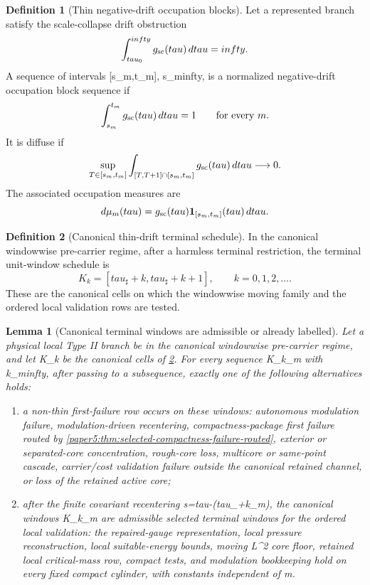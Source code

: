 \documentclass[11pt]{amsart}
\def\({}%
\def\){}%
\def\tau{tau}%
\def\infty{infty}%
\theoremstyle{plain}
\newtheorem{lemma}[lemma]{Lemma}
\theoremstyle{definition}
\newtheorem{definition}[definition]{Definition}
\theoremstyle{remark}
\begin{document}
\begin{definition}[Thin negative-drift occupation blocks]
\label{paper6a:def:thin-negative-drift-occupation-blocks}
Let a represented branch satisfy the scale-collapse drift obstruction
\[
  \int_{\tau_0}^{\infty} g_{\rm sc}(\tau)\,d\tau=\infty .
\]
A sequence of intervals \([s_m,t_m]\), \(s_m\to\infty\), is a normalized
negative-drift occupation block sequence if
\[
  \int_{s_m}^{t_m}g_{\rm sc}(\tau)\,d\tau=1
  \qquad\text{for every }m.
\]
It is diffuse if
\[
  \sup_{T\in[s_m,t_m]}
  \int_{[T,T+1]\cap[s_m,t_m]} g_{\rm sc}(\tau)\,d\tau
  \longrightarrow0 .
\]
The associated occupation measures are
\[
  d\mu_m(\tau)=g_{\rm sc}(\tau)\mathbf 1_{[s_m,t_m]}(\tau)\,d\tau .
\]
\end{definition}

\begin{definition}[Canonical thin-drift terminal schedule]
\label{paper6a:def:canonical-thin-drift-schedule}
In the canonical windowwise pre-carrier regime, after a harmless terminal
restriction, the terminal unit-window schedule is
\[
  K_k=[\tau_\sharp+k,\tau_\sharp+k+1],
  \qquad k=0,1,2,\ldots .
\]
These are the canonical cells on which the windowwise moving family and the
ordered local validation rows are tested.
\end{definition}

\begin{lemma}[Canonical terminal windows are admissible or already labelled]
\label{paper6a:lem:terminal-unit-drift-window-admissibility}
Let a physical local Type II branch be in the canonical windowwise
pre-carrier regime, and let \(K_k\) be the canonical cells of
\cref{paper6a:def:canonical-thin-drift-schedule}.  For every sequence
\(K_{k_m}\) with \(k_m\to\infty\), after passing to a subsequence, exactly one
of the following alternatives holds:
\begin{enumerate}[label=\textup{(A\arabic*)}]
\item a non-thin first-failure row occurs on these windows: autonomous
      modulation failure, modulation-driven recentering, compactness-package
      first failure routed by
      \cref{paper5:thm:selected-compactness-failure-routed}, exterior or
      separated-core concentration, rough-core loss, multicore or same-point
      cascade, carrier/cost validation failure outside the canonical retained
      channel, or loss of the retained active core;
\item after the finite covariant recentering \(s=\tau-(\tau_\sharp+k_m)\), the
      canonical windows \(K_{k_m}\) are admissible selected terminal windows
      for the ordered local validation: the repaired-gauge representation,
      local pressure
      reconstruction, local suitable-energy bounds, moving \(L^2\) core floor,
      retained local critical-mass row, compact tests, and modulation
      bookkeeping hold on every fixed compact cylinder, with constants
      independent of \(m\).
\end{enumerate}
\end{lemma}
\end{document}
